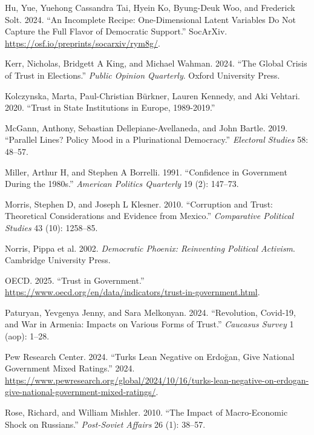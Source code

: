 \documentclass[
  12pt,
]{article}
\newlength{\cslhangindent}
\newenvironment{CSLReferences}[2] %
 {\begin{list}{}{%
  \setlength{\itemindent}{0pt}
  \setlength{\leftmargin}{0pt}
  \setlength{\parsep}{0pt}
  \ifodd #1
   \setlength{\leftmargin}{\cslhangindent}
   \setlength{\itemindent}{-1\cslhangindent}
  \fi
  \setlength{\itemsep}{#2\baselineskip}}}
 {\end{list}}
\begin{document}
\begin{CSLReferences}{1}{0}
Hu, Yue, Yuehong Cassandra Tai, Hyein Ko, Byung-Deuk Woo, and Frederick Solt. 2024. {``An Incomplete Recipe: One-Dimensional Latent Variables Do Not Capture the Full Flavor of Democratic Support.''} SocArXiv. \url{https://osf.io/preprints/socarxiv/rym8g/}.

Kerr, Nicholas, Bridgett A King, and Michael Wahman. 2024. {``The Global Crisis of Trust in Elections.''} \emph{Public Opinion Quarterly}. Oxford University Press.

Kolczynska, Marta, Paul-Christian Bürkner, Lauren Kennedy, and Aki Vehtari. 2020. {``Trust in State Institutions in Europe, 1989-2019.''}

McGann, Anthony, Sebastian Dellepiane-Avellaneda, and John Bartle. 2019. {``Parallel Lines? Policy Mood in a Plurinational Democracy.''} \emph{Electoral Studies} 58: 48--57.

Miller, Arthur H, and Stephen A Borrelli. 1991. {``Confidence in Government During the 1980s.''} \emph{American Politics Quarterly} 19 (2): 147--73.

Morris, Stephen D, and Joseph L Klesner. 2010. {``Corruption and Trust: Theoretical Considerations and Evidence from Mexico.''} \emph{Comparative Political Studies} 43 (10): 1258--85.

Norris, Pippa et al. 2002. \emph{Democratic Phoenix: Reinventing Political Activism}. Cambridge University Press.

OECD. 2025. {``Trust in Government.''} \url{https://www.oecd.org/en/data/indicators/trust-in-government.html}.

Paturyan, Yevgenya Jenny, and Sara Melkonyan. 2024. {``Revolution, Covid-19, and War in Armenia: Impacts on Various Forms of Trust.''} \emph{Caucasus Survey} 1 (aop): 1--28.

Pew Research Center. 2024. {``Turks Lean Negative on Erdoğan, Give National Government Mixed Ratings.''} 2024. \url{https://www.pewresearch.org/global/2024/10/16/turks-lean-negative-on-erdogan-give-national-government-mixed-ratings/}.

Rose, Richard, and William Mishler. 2010. {``The Impact of Macro-Economic Shock on Russians.''} \emph{Post-Soviet Affairs} 26 (1): 38--57.


\end{CSLReferences}
\end{document}
